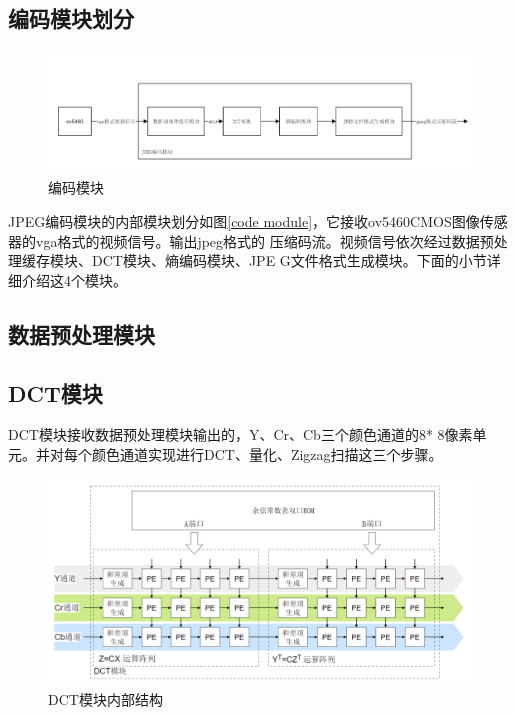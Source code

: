\documentclass{article}
\numberwithin {equation}{section}
\begin{document}
\begin{spacing}{1.25}
  \subsection{编码模块划分}
    \vspace{1em}
    \begin{figure}[H]
      \centering
      \includegraphics[scale=0.3]{./pictures/编码模块.png}
      \caption{编码模块}
      \label{code module}
    \end{figure}
    JPEG编码模块的内部模块划分如图\ref{code 
    module}，它接收ov5460CMOS图像传感器的vga格式的视频信号。输出jpeg格式的
    压缩码流。视频信号依次经过数据预处理缓存模块、DCT模块、熵编码模块、JPE
    G文件格式生成模块。下面的小节详细介绍这4个模块。
  \subsection{数据预处理模块}
    \vspace{1em}
  \subsection{DCT模块}
    \vspace{1em}
    DCT模块接收数据预处理模块输出的，Y、Cr、Cb三个颜色通道的8*
    8像素单元。并对每个颜色通道实现进行DCT、量化、Zigzag扫描这三个步骤。
    \begin{figure}[H]
      \centering
      \includegraphics[scale=0.5]{./pictures/dct.png}
      \caption{DCT模块内部结构}
      \label{code module}
    \end{figure}


\end{spacing}
\end{document}
